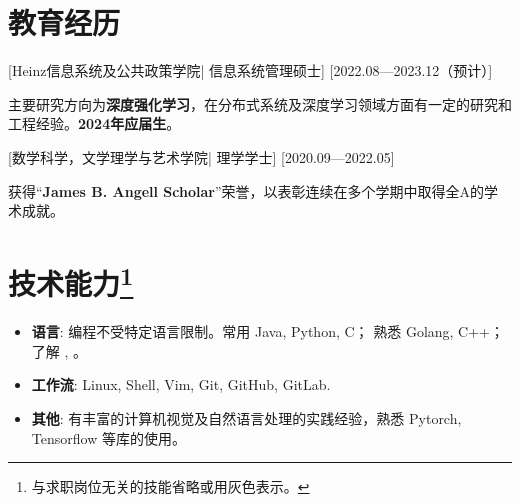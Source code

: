 \documentclass{resume}
\begin{document}


\ResumeTitle


\section{教育经历}
[\textnormal{Heinz信息系统及公共政策学院|}  信息系统管理硕士]
[2022.08—2023.12（预计）]

主要研究方向为\textbf{深度强化学习}，在分布式系统及深度学习领域方面有一定的研究和工程经验。\textbf{2024年应届生}。


[\textnormal{数学科学，文学理学与艺术学院|} 理学学士]
[2020.09—2022.05]

获得“\textbf{James B. Angell Scholar}”荣誉，以表彰连续在多个学期中取得全A的学术成就。

\section[技术能力]{技术能力\protect\footnote{与求职岗位无关的技能省略或用灰色表示。}}
\begin{itemize}
  \item \textbf{语言}: 编程不受特定语言限制。常用 Java, Python, C； 熟悉 Golang, C++；了解 , 。
  \item \textbf{工作流}: Linux, Shell, Vim, Git, GitHub, GitLab.
  \item \textbf{其他}: 有丰富的计算机视觉及自然语言处理的实践经验，熟悉 Pytorch, Tensorflow 等库的使用。
\end{itemize}
\end{document}
